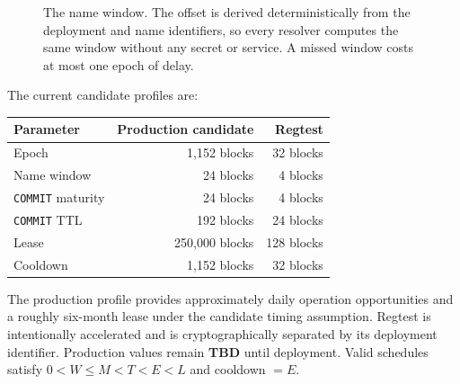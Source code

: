 \documentclass[11pt]{article}
\newcommand{\operation}[1]{\texttt{#1}}
\newcommand{\statusword}[1]{\textbf{#1}}
\begin{document}
\begin{figure}[ht]
\centering
{}
\caption{The name window. The offset is derived deterministically from the
deployment and name identifiers, so every resolver computes the same window
without any secret or service. A missed window costs at most one epoch of
delay.}
\label{fig:window}
\end{figure}

The current candidate profiles are:

\begin{center}
\small
\begin{tabular}{lrr}
\toprule
Parameter & Production candidate & Regtest \\
\midrule
Epoch & 1,152 blocks & 32 blocks \\
Name window & 24 blocks & 4 blocks \\
\operation{COMMIT} maturity & 24 blocks & 4 blocks \\
\operation{COMMIT} TTL & 192 blocks & 24 blocks \\
Lease & 250,000 blocks & 128 blocks \\
Cooldown & 1,152 blocks & 32 blocks \\
\bottomrule
\end{tabular}
\end{center}

The production profile provides approximately daily operation opportunities
and a roughly six-month lease under the candidate timing assumption. Regtest
is intentionally accelerated and is cryptographically separated by its
deployment identifier. Production values remain \statusword{TBD} until
deployment. Valid schedules satisfy
$0 < W \le M < T < E < L$ and cooldown $= E$.
\end{document}
